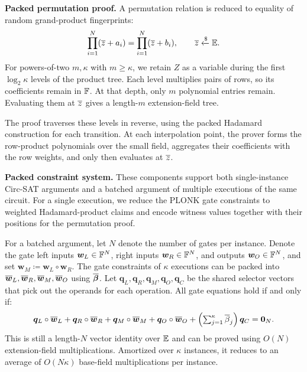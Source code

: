 \medskip\noindent\textbf{Packed permutation proof.}
A permutation relation is reduced to equality of random
grand-product fingerprints:
\[
    \prod_{i=1}^{N}(\overline{z}+a_i)
       =\prod_{i=1}^{N}(\overline{z}+b_i),
       \qquad \overline{z}\mathrel{\xleftarrow{\$}}\mathbb{E}.
\]
For powers-of-two \(m,\kappa\) with \(m\geq\kappa\), we
retain \(Z\) as a variable during the first \(\log_2\kappa\)
levels of the product tree.
Each level multiplies pairs of rows, so its coefficients
remain in \({\mathbb{F}}\).
At that depth, only \(m\) polynomial entries remain.
Evaluating them at \(\overline{z}\) gives a length-\(m\)
extension-field tree.

The proof traverses these levels in reverse, using the packed
Hadamard construction for each transition.
At each interpolation point, the prover forms the row-product
polynomials over the small field, aggregates their coefficients
with the row weights, and only then evaluates at \(\overline{z}\).

\medskip\noindent\textbf{Packed constraint system.}
These components support both single-instance Circ-SAT arguments and a
batched argument of multiple executions of the same circuit.
For a single execution, we reduce the PLONK gate constraints
to weighted Hadamard-product claims and encode witness values
together with their positions for the permutation proof.

For a batched argument, let \(N\) denote the number of gates per instance.
Denote the gate left inputs \(\bm{w}_L \in {\mathbb{F}}^N\), right inputs
\(\bm{w}_R \in {\mathbb{F}}^N\), and outputs \(\bm{w}_O \in {\mathbb{F}}^N\), and set
\(\bm w_M\coloneqq \bm w_L\circ\bm w_R\).
The gate constraints of \(\kappa\) executions can be packed into
\(\overline{\bm w}_L,\overline{\bm w}_R,\overline{\bm w}_M,\overline{\bm w}_O\)
using \(\overline{\bm\beta}\).
Let \(\bm{q}_L, \bm{q}_R, \bm{q}_M, \bm{q}_O, \bm{q}_C\) be the shared selector
vectors that pick out the operands for each operation. All gate equations
hold if and only if:
\[
    \bm q_L\circ\overline{\bm w}_L
    +\bm q_R\circ\overline{\bm w}_R
    +\bm q_M\circ\overline{\bm w}_M
    +\bm q_O\circ\overline{\bm w}_O
    +\left(\textstyle\sum_{j=1}^{\kappa}\overline{\beta}_j\right)\bm q_C
       =\bm0_N.
\]
This is still a length-\(N\) vector identity over \(\mathbb{E}\) and can be
proved using \(O(N)\) extension-field multiplications. Amortized over \(\kappa\)
instances, it reduces to an average of \(O(N\kappa)\) base-field multiplications
per instance.